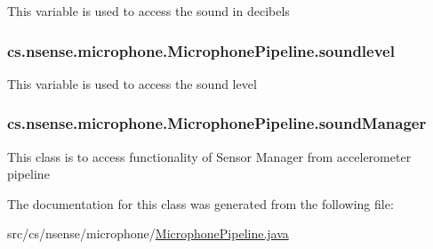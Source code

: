 This variable is used to access the sound in decibels \hypertarget{classcs_1_1nsense_1_1microphone_1_1_microphone_pipeline_ab1333d6f5735373cbacef07ca8d7a775}{
\subsubsection[{soundlevel}]{ cs.\-nsense.\-microphone.\-Microphone\-Pipeline.\-soundlevel\hspace{0.3cm}{\ttfamily [private]}}}\label{classcs_1_1nsense_1_1microphone_1_1_microphone_pipeline_ab1333d6f5735373cbacef07ca8d7a775}
This variable is used to access the sound level \hypertarget{classcs_1_1nsense_1_1microphone_1_1_microphone_pipeline_a60aecbf21d53efec2168b78b945eaca1}{
\subsubsection[{sound\-Manager}]{ cs.\-nsense.\-microphone.\-Microphone\-Pipeline.\-sound\-Manager\hspace{0.3cm}{\ttfamily [private]}}}\label{classcs_1_1nsense_1_1microphone_1_1_microphone_pipeline_a60aecbf21d53efec2168b78b945eaca1}
This class is to access functionality of Sensor Manager from accelerometer pipeline 

The documentation for this class was generated from the following file\-:\begin{DoxyCompactItemize}
\item 
src/cs/nsense/microphone/\hyperlink{_microphone_pipeline_8java}{Microphone\-Pipeline.\-java}\end{DoxyCompactItemize}
